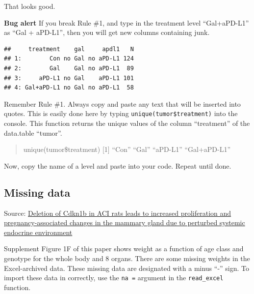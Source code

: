 \documentclass[]{book}
\begin{document}
That looks good.

\textbf{Bug alert} If you break Rule \#1, and type in the treatment level ``Gal+aPD-L1'' as ``Gal + aPD-L1'', then you will get new columns containing junk.

\begin{verbatim}
##     treatment    gal     apdl1   N
## 1:        Con no Gal no aPD-L1 124
## 2:        Gal    Gal no aPD-L1  89
## 3:     aPD-L1 no Gal    aPD-L1 101
## 4: Gal+aPD-L1 no Gal no aPD-L1  58
\end{verbatim}

Remember Rule \#1. Always copy and paste any text that will be inserted into quotes. This is easily done here by typing \texttt{unique(tumor\$treatment)} into the console. This function returns the unique values of the column ``treatment'' of the data.table ``tumor''.

\begin{quote}
unique(tumor\$treatment)
{[}1{]} ``Con'' ``Gal'' ``aPD-L1'' ``Gal+aPD-L1''
\end{quote}

Now, copy the name of a level and paste into your code. Repeat until done.

\hypertarget{missing-data}{%
\subsection{Missing data}\label{missing-data}}

Source: \href{https://journals.plos.org/plosgenetics/article?id=10.1371/journal.pgen.1008002\&rev=1}{Deletion of Cdkn1b in ACI rats leads to increased proliferation and pregnancy-associated changes in the mammary gland due to perturbed systemic endocrine environment}

Supplement Figure 1F of this paper shows weight as a function of age class and genotype for the whole body and 8 organs. There are some missing weights in the Excel-archived data. These missing data are designated with a minus ``-'' sign. To import these data in correctly, use the \texttt{na\ =} argument in the \texttt{read\_excel} function.
\end{document}
